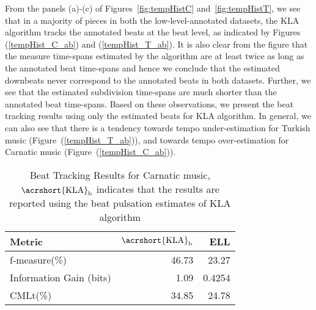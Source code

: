 From the panels (a)-(c) of Figures~\ref{fig:tempHistC} and~\ref{fig:tempHistT}, we see that in a majority of pieces in both the low-level-annotated datasets, the \acrshort{KLA} algorithm tracks the annotated beats at the beat level, as indicated by Figures (\ref{tempHist_C_ab}) and (\ref{tempHist_T_ab}). It is also clear from the figure that the measure time-spans estimated by the algorithm are at least twice as long as the annotated beat time-spans and hence we conclude that the estimated downbeats never correspond to the annotated beats in both datasets. Further, we see that the estimated subdivision time-spans are much shorter than the annotated beat time-spans. Based on these observations, we present the beat tracking results using only the estimated beats for \acrshort{KLA} algorithm. In general, we can also see that there is a tendency towards tempo under-estimation for Turkish music (Figure~(\ref{tempHist_T_ab})), and towards tempo over-estimation for Carnatic music (Figure~(\ref{tempHist_C_ab})). 
\begin{table}
\begin{centering}
\begin{tabular}{@{}lrr@{}}
\toprule
Metric & $\mathrm{\acrshort{KLA}}_{\mathrm{b}}$ & \acrshort{ELL}\tabularnewline \midrule
f-measure(\%) &  46.73 &  23.27\tabularnewline
Information Gain (bits) & 1.09 &  0.4254\tabularnewline
CMLt(\%) & 34.85 & 24.78\tabularnewline \bottomrule
\end{tabular}
\par\end{centering}
\caption{Beat Tracking Results for Carnatic music, $\mathrm{\acrshort{KLA}}_{\mathrm{b}}$ indicates that the results are reported using the beat pulsation estimates of \acrshort{KLA} algorithm}\label{tab:jnmreval:btKLA}
\end{table}

